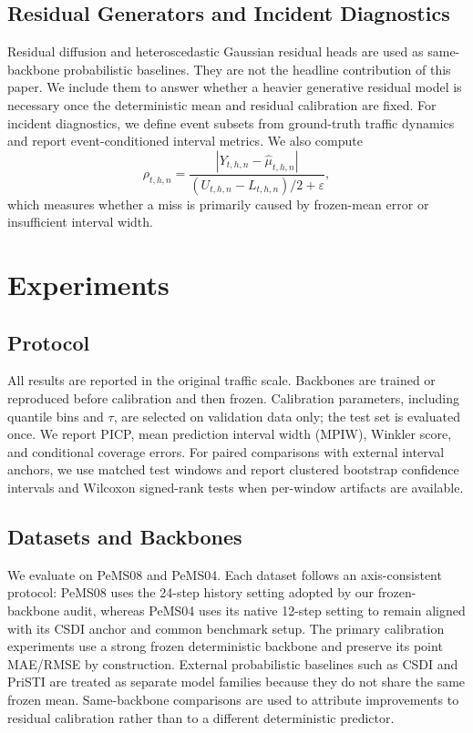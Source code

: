 \documentclass[letterpaper,journal]{IEEEtran}
\begin{document}
\subsection{Residual Generators and Incident Diagnostics}
Residual diffusion and heteroscedastic Gaussian residual heads are used as same-backbone probabilistic baselines. They are not the headline contribution of this paper. We include them to answer whether a heavier generative residual model is necessary once the deterministic mean and residual calibration are fixed. For incident diagnostics, we define event subsets from ground-truth traffic dynamics and report event-conditioned interval metrics. We also compute
\begin{equation}
    \rho_{t,h,n}=\frac{|Y_{t,h,n}-\hat{\mu}_{t,h,n}|}{(U_{t,h,n}-L_{t,h,n})/2+\varepsilon},
\end{equation}
which measures whether a miss is primarily caused by frozen-mean error or insufficient interval width.

\section{Experiments}

\subsection{Protocol}
All results are reported in the original traffic scale. Backbones are trained or reproduced before calibration and then frozen. Calibration parameters, including quantile bins and $\tau$, are selected on validation data only; the test set is evaluated once. We report PICP, mean prediction interval width (MPIW), Winkler score, and conditional coverage errors. For paired comparisons with external interval anchors, we use matched test windows and report clustered bootstrap confidence intervals and Wilcoxon signed-rank tests when per-window artifacts are available.

\subsection{Datasets and Backbones}
We evaluate on PeMS08 and PeMS04. Each dataset follows an axis-consistent protocol: PeMS08 uses the 24-step history setting adopted by our frozen-backbone audit, whereas PeMS04 uses its native 12-step setting to remain aligned with its CSDI anchor and common benchmark setup. The primary calibration experiments use a strong frozen deterministic backbone and preserve its point MAE/RMSE by construction. External probabilistic baselines such as CSDI and PriSTI are treated as separate model families because they do not share the same frozen mean. Same-backbone comparisons are used to attribute improvements to residual calibration rather than to a different deterministic predictor.
\end{document}
